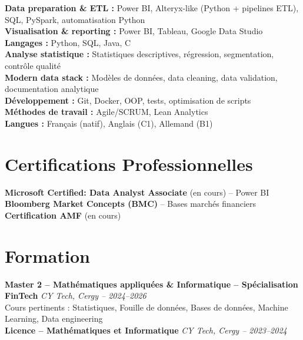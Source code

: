 \documentclass[10pt, letterpaper]{article}
\begin{document}
\textbf{Data preparation \& ETL :} Power BI, Alteryx-like (Python + pipelines ETL), SQL, PySpark, automatisation Python\\
\textbf{Visualisation \& reporting :} Power BI, Tableau, Google Data Studio\\
\textbf{Langages :} Python, SQL, Java, C\\
\textbf{Analyse statistique :} Statistiques descriptives, régression, segmentation, contrôle qualité\\
\textbf{Modern data stack :} Modèles de données, data cleaning, data validation, documentation analytique\\
\textbf{Développement :} Git, Docker, OOP, tests, optimisation de scripts\\
\textbf{Méthodes de travail :} Agile/SCRUM, Lean Analytics\\
\textbf{Langues :} Français (natif), Anglais (C1), Allemand (B1)

\section*{Certifications Professionnelles}

\textbf{Microsoft Certified: Data Analyst Associate} (en cours) – Power BI \\
\textbf{Bloomberg Market Concepts (BMC)} – Bases marchés financiers \\
\textbf{Certification AMF} (en cours)

\section*{Formation}

\textbf{Master 2 – Mathématiques appliquées \& Informatique – Spécialisation FinTech} 
\hfill \textit{CY Tech, Cergy – 2024–2026}\\
Cours pertinents : Statistiques, Fouille de données, Bases de données, Machine Learning, Data engineering\\
\textbf{Licence – Mathématiques et Informatique} 
\hfill \textit{CY Tech, Cergy – 2023–2024}
\end{document}
